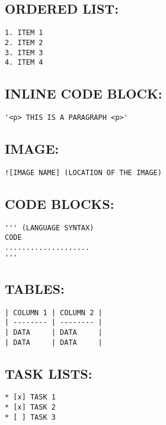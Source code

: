 \documentclass[10pt]{article}
\begin{document}
\subsection{ORDERED LIST:}
\begin{verbatim}
1. ITEM 1
2. ITEM 2
3. ITEM 3
4. ITEM 4
\end{verbatim}

\subsection{INLINE CODE BLOCK:}
\begin{verbatim}
'<p> THIS IS A PARAGRAPH <p>'
\end{verbatim}

\subsection{IMAGE:}
\begin{verbatim}
![IMAGE NAME] (LOCATION OF THE IMAGE)
\end{verbatim}

\subsection{CODE BLOCKS:}
\begin{verbatim}
''' (LANGUAGE SYNTAX)
CODE 
....................
'''
\end{verbatim}

\subsection{TABLES:}
\begin{verbatim}
| COLUMN 1 | COLUMN 2 |
| -------- | -------- |
| DATA     | DATA     |
| DATA     | DATA     |
\end{verbatim}

\subsection{TASK LISTS:}
\begin{verbatim}
* [x] TASK 1
* [x] TASK 2
* [ ] TASK 3
\end{verbatim}
\end{document}
